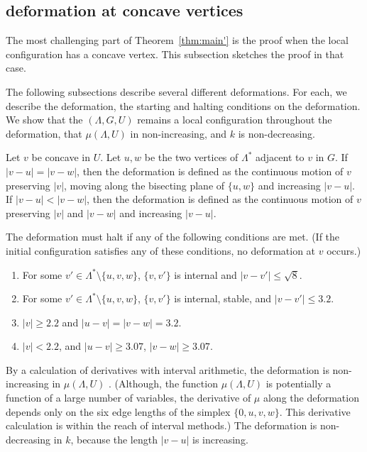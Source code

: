 \documentclass{article} %
\begin{document}
\subsection{deformation at concave vertices}\label{sec:concave}

The most challenging part  of Theorem~\ref{thm:main'} is the
proof when the local configuration has a concave vertex.  This subsection
sketches the proof in that case.

The following subsections describe several different  deformations.  For each,
we describe the deformation, the starting and halting conditions on 
the deformation.  We show that the $(\Lambda,G,U)$ remains a local
configuration throughout the deformation, 
 that  $\mu(\Lambda,U)$ in non-increasing, and $k$ is
non-decreasing.


Let $v$ be concave in $U$.  Let $u,w$ be the two vertices of
$\Lambda^*$ adjacent to $v$ in $G$. 
If $|v-u|=|v-w|$, then the deformation is defined as the continuous motion
of $v$ preserving $|v|$,  moving along the bisecting plane of $\{u,w\}$
and increasing $|v-u|$.  If $|v-u|<|v-w|$, then the deformation
is defined as the continuous motion of $v$ preserving $|v|$ and
$|v-w|$ and increasing $|v-u|$.

The deformation must halt if any of the following conditions
are met.  (If the initial configuration satisfies any of these conditions,
no deformation at $v$ occurs.)
\begin{enumerate}\label{e:halt}
\item For some $v'\in\Lambda^*\setminus\{u,v,w\}$, 
$\{v,v'\}$ is internal and $|v-v'|\le \sqrt8$.
\item For some $v'\in\Lambda^*\setminus\{u,v,w\}$,
$\{v,v'\}$ is internal, stable, and $|v-v'|\le 3.2$.
\item $|v|\ge 2.2$ and $|u-v|=|v-w|=3.2$.  
\item $|v|< 2.2$, 
and $|u-v|\ge 3.07$, $|v-w|\ge 3.07$.
\end{enumerate}

By a calculation of derivatives with interval arithmetic,
the deformation is non-increasing in $\mu(\Lambda,U)$ \cite[Lemma~7.7]{arx}.  (Although, the function $\mu(\Lambda,U)$ is potentially a 
function of a large number of variables, the derivative of $\mu$
along the deformation depends only on the six edge lengths  of
the simplex $\{0,u,v,w\}$.  This derivative calculation is within
the reach of interval methods.)
The deformation is non-decreasing in $k$, because the length
$|v-u|$ is increasing.
\end{document}
